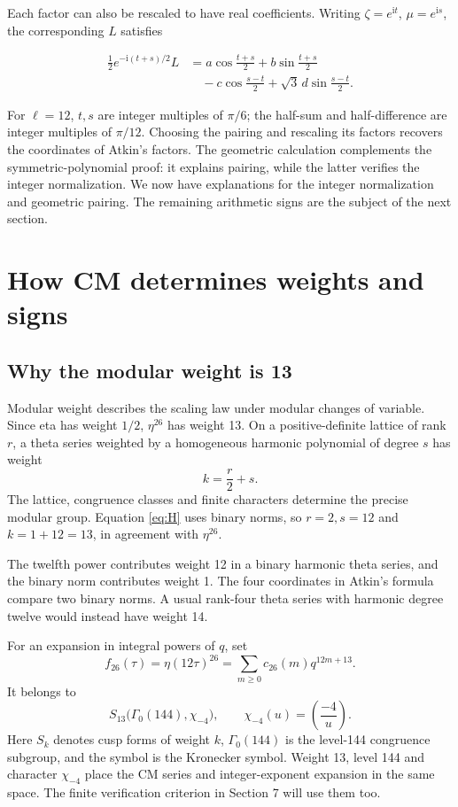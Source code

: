 \documentclass[a4paper,11pt]{article}
\theoremstyle{definition}
\newcommand{\iu}{\mathrm i}
\begin{document}
Each factor can also be rescaled to have real coefficients.
Writing \(\zeta=e^{\iu t}\), \(\mu=e^{\iu s}\), the corresponding \(L\) satisfies

\begin{equation}\label{eq:realpairing}
 \begin{aligned}
 \frac12 e^{-\iu(t+s)/2}L
 &=a\cos\frac{t+s}{2}+b\sin\frac{t+s}{2}\\
 &\quad{}-c\cos\frac{s-t}{2}
       +\sqrt3\,d\sin\frac{s-t}{2}.
 \end{aligned}
\end{equation}

For \(\ell=12\), \(t,s\) are integer multiples of \(\pi/6\);
the half-sum and half-difference are integer multiples of \(\pi/12\).
Choosing the pairing and rescaling its factors recovers the
coordinates of Atkin's factors. The geometric calculation
complements the symmetric-polynomial proof: it explains
pairing, while the latter verifies the integer normalization.
We now have explanations for the integer normalization and geometric pairing.
The remaining arithmetic signs are the subject of the next section.
\section{How CM determines weights and signs}
\subsection{Why the modular weight is 13}
Modular weight describes the scaling law under modular changes of variable.
Since eta has weight \(1/2\), \(\eta^{26}\) has weight 13.
On a positive-definite lattice of rank \(r\), a theta series weighted
by a homogeneous harmonic polynomial of degree \(s\) has weight
\begin{equation}\label{eq:harmonicweight}
 k=\frac r2+s.
\end{equation}
The lattice, congruence classes and finite characters determine the
precise modular group. Equation \eqref{eq:H} uses binary norms, so
\(r=2,s=12\) and \(k=1+12=13\), in agreement with \(\eta^{26}\).

The twelfth power contributes weight 12 in a binary harmonic theta series,
and the binary norm contributes weight 1. The four coordinates in
Atkin's formula compare two binary norms. A usual rank-four
theta series with harmonic degree twelve would instead have weight 14.

For an expansion in integral powers of \(q\), set
\begin{equation}\label{eq:f26}
 f_{26}(\tau)=\eta(12\tau)^{26}
            =\sum_{m\geq0}c_{26}(m)q^{12m+13}.
\end{equation}
It belongs to
\begin{equation}\label{eq:space}
 S_{13}\bigl(\Gamma_0(144),\chi_{-4}\bigr),\qquad
 \chi_{-4}(u)=\left(\frac{-4}{u}\right).
\end{equation}
Here \(S_k\) denotes cusp forms of weight \(k\),
\(\Gamma_0(144)\) is the level-144 congruence subgroup, and the
symbol is the Kronecker symbol.
Weight 13, level 144 and character \(\chi_{-4}\) place
the CM series and integer-exponent expansion in the same space.
The finite verification criterion in Section 7 will use them too.
\end{document}
